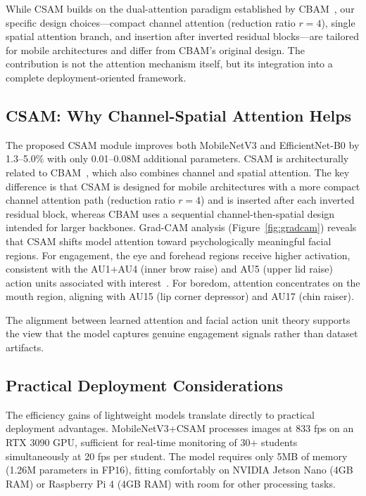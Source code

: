 \documentclass[apajournal,article,submit,pdftex,moreauthors]{Definitions/mdpi}
\begin{document}
While CSAM builds on the dual-attention paradigm established by CBAM~\citep{woo2018cbam}, our specific design choices---compact channel attention (reduction ratio $r=4$), single spatial attention branch, and insertion after inverted residual blocks---are tailored for mobile architectures and differ from CBAM's original design. The contribution is not the attention mechanism itself, but its integration into a complete deployment-oriented framework.

\subsection{CSAM: Why Channel-Spatial Attention Helps}

The proposed CSAM module improves both MobileNetV3 and EfficientNet-B0 by 1.3--5.0\% with only 0.01--0.08M additional parameters. CSAM is architecturally related to CBAM~\citep{woo2018cbam}, which also combines channel and spatial attention. The key difference is that CSAM is designed for mobile architectures with a more compact channel attention path (reduction ratio $r=4$) and is inserted after each inverted residual block, whereas CBAM uses a sequential channel-then-spatial design intended for larger backbones. Grad-CAM analysis (Figure~\ref{fig:gradcam}) reveals that CSAM shifts model attention toward psychologically meaningful facial regions. For engagement, the eye and forehead regions receive higher activation, consistent with the AU1+AU4 (inner brow raise) and AU5 (upper lid raise) action units associated with interest~\citep{jampour2022multiview}. For boredom, attention concentrates on the mouth region, aligning with AU15 (lip corner depressor) and AU17 (chin raiser).

The alignment between learned attention and facial action unit theory supports the view that the model captures genuine engagement signals rather than dataset artifacts.

\subsection{Practical Deployment Considerations}

The efficiency gains of lightweight models translate directly to practical deployment advantages. MobileNetV3+CSAM processes images at 833 fps on an RTX 3090 GPU, sufficient for real-time monitoring of 30+ students simultaneously at 20 fps per student. The model requires only 5MB of memory (1.26M parameters in FP16), fitting comfortably on NVIDIA Jetson Nano (4GB RAM) or Raspberry Pi 4 (4GB RAM) with room for other processing tasks.
\end{document}
